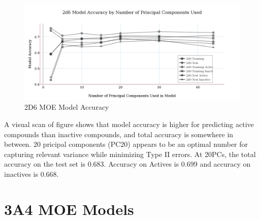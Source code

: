\begin{figure}[!h]
\includegraphics[width=1\textwidth]{../img/2d6_moe_model_accuracy.png}
\caption{2D6 MOE Model Accuracy}
\end{figure}

A visual scan of figure shows that model accuracy is higher for predicting active compounds than inactive compounds, and total accuracy is somewhere in between. 20 pricipal components (PC20) appears to be an optimal number for capturing relevant variance while minimizing Type II errors. At 20PCs, the total accuracy on the test set is 0.683. Accuracy on Actives is 0.699 and accuracy on inactives is 0.668.


\section{3A4 MOE Models}

